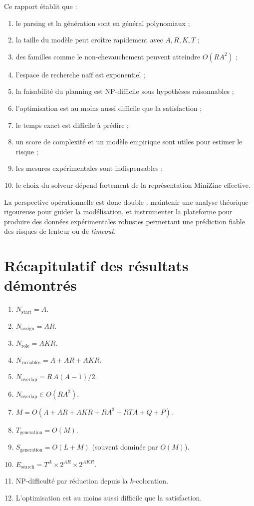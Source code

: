 \documentclass[12pt,a4paper]{article}
\begin{document}
Ce rapport établit que :
\begin{enumerate}[label=\arabic*.]
  \item le parsing et la génération sont en général polynomiaux ;
  \item la taille du modèle peut croître rapidement avec $A,R,K,T$ ;
  \item des familles comme le non-chevauchement peuvent atteindre $O(RA^2)$ ;
  \item l'espace de recherche naïf est exponentiel ;
  \item la faisabilité du planning est NP-difficile sous hypothèses raisonnables ;
  \item l'optimisation est au moins aussi difficile que la satisfaction ;
  \item le temps exact est difficile à prédire ;
  \item un score de complexité et un modèle empirique sont utiles pour estimer le risque ;
  \item les mesures expérimentales sont indispensables ;
  \item le choix du solveur dépend fortement de la représentation MiniZinc effective.
\end{enumerate}

La perspective opérationnelle est donc double : maintenir une analyse théorique rigoureuse pour guider la modélisation, et instrumenter la plateforme pour produire des données expérimentales robustes permettant une prédiction fiable des risques de lenteur ou de \textit{timeout}.

\section{Récapitulatif des résultats démontrés}
\begin{enumerate}[label=\arabic*.]
  \item $N_{\text{start}}=A$.
  \item $N_{\text{assign}}=AR$.
  \item $N_{\text{role}}=AKR$.
  \item $N_{\text{variables}}=A+AR+AKR$.
  \item $N_{\text{overlap}}=R\,A(A-1)/2$.
  \item $N_{\text{overlap}}\in O(RA^2)$.
  \item $M=O(A+AR+AKR+RA^2+RTA+Q+P)$.
  \item $T_{\text{generation}}=O(M)$.
  \item $S_{\text{generation}}=O(L+M)$ (souvent dominée par $O(M)$).
  \item $E_{\text{search}}=T^A\times 2^{AR}\times 2^{AKR}$.
  \item NP-difficulté par réduction depuis la $k$-coloration.
  \item L'optimisation est au moins aussi difficile que la satisfaction.
\end{enumerate}
\end{document}
